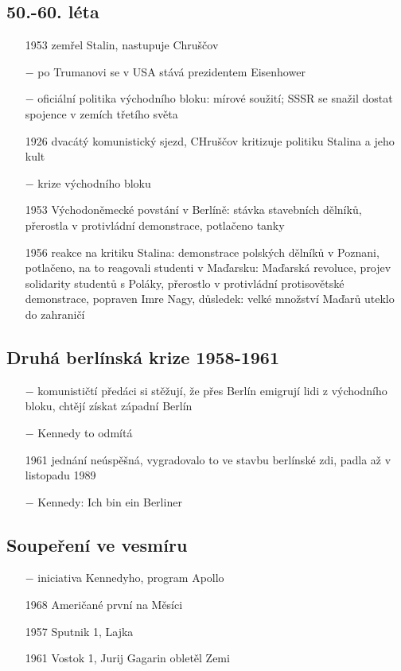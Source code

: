 \documentclass{article}
\begin{document}
\subsection*{50.-60. léta}
\begin{itemize}
    \vspace{-0.5em}
    \setlength\itemsep{0.15em}
    \item[1953] zemřel Stalin, nastupuje Chruščov
    \item[$-$] po Trumanovi se v USA stává prezidentem Eisenhower
    \item[$-$] oficiální politika východního bloku: mírové soužití; SSSR se snažil dostat spojence v zemích třetího světa
    \item[1926] dvacátý komunistický sjezd, CHruščov kritizuje politiku Stalina a jeho kult
    \item[$-$] krize východního bloku
    \item[1953] Východoněmecké povstání v Berlíně: stávka stavebních dělníků, přerostla v protivládní demonstrace, potlačeno tanky
    \item[1956] reakce na kritiku Stalina: demonstrace polských dělníků v Poznani, potlačeno, na to reagovali studenti v Maďarsku: Maďarská revoluce, projev solidarity studentů s Poláky, přerostlo v protivládní protisovětské demonstrace, popraven Imre Nagy, důsledek: velké množství Maďarů uteklo do zahraničí
\end{itemize}

\subsection*{Druhá berlínská krize 1958-1961}
\begin{itemize}
    \vspace{-0.5em}
    \setlength\itemsep{0.15em}
    \item[$-$] komunističtí předáci si stěžují, že přes Berlín emigrují lidi z východního bloku, chtějí získat západní Berlín
    \item[$-$] Kennedy to odmítá
    \item[1961] jednání neúspěšná, vygradovalo to ve stavbu berlínské zdi, padla až v listopadu 1989
    \item[$-$] Kennedy: Ich bin ein Berliner
\end{itemize}

\subsection*{Soupeření ve vesmíru}
\begin{itemize}
    \vspace{-0.5em}
    \setlength\itemsep{0.15em}
    \item[$-$] iniciativa Kennedyho, program Apollo
    \item[1968] Američané první na Měsíci
    \item[1957] Sputnik 1, Lajka
    \item[1961] Vostok 1, Jurij Gagarin obletěl Zemi
\end{itemize}
\end{document}
